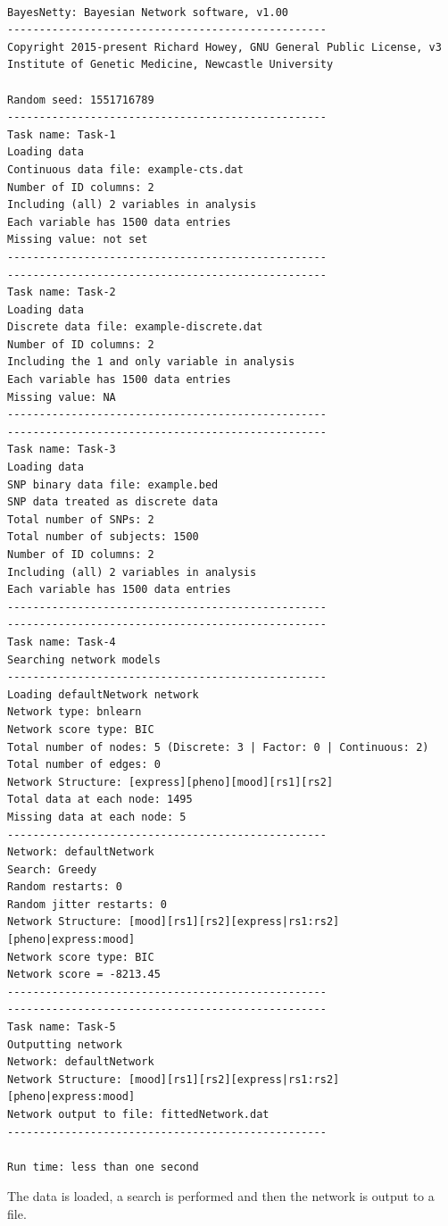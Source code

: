 \documentclass[a4paper,12pt]{article}
\begin{document}
\vspace{0.35cm} \begin{lstlisting}

BayesNetty: Bayesian Network software, v1.00
--------------------------------------------------
Copyright 2015-present Richard Howey, GNU General Public License, v3
Institute of Genetic Medicine, Newcastle University

Random seed: 1551716789
--------------------------------------------------
Task name: Task-1
Loading data
Continuous data file: example-cts.dat
Number of ID columns: 2
Including (all) 2 variables in analysis
Each variable has 1500 data entries
Missing value: not set
--------------------------------------------------
--------------------------------------------------
Task name: Task-2
Loading data
Discrete data file: example-discrete.dat
Number of ID columns: 2
Including the 1 and only variable in analysis
Each variable has 1500 data entries
Missing value: NA
--------------------------------------------------
--------------------------------------------------
Task name: Task-3
Loading data
SNP binary data file: example.bed
SNP data treated as discrete data
Total number of SNPs: 2
Total number of subjects: 1500
Number of ID columns: 2
Including (all) 2 variables in analysis
Each variable has 1500 data entries
--------------------------------------------------
--------------------------------------------------
Task name: Task-4
Searching network models
--------------------------------------------------
Loading defaultNetwork network
Network type: bnlearn
Network score type: BIC
Total number of nodes: 5 (Discrete: 3 | Factor: 0 | Continuous: 2)
Total number of edges: 0
Network Structure: [express][pheno][mood][rs1][rs2]
Total data at each node: 1495
Missing data at each node: 5
--------------------------------------------------
Network: defaultNetwork
Search: Greedy
Random restarts: 0
Random jitter restarts: 0
Network Structure: [mood][rs1][rs2][express|rs1:rs2][pheno|express:mood]
Network score type: BIC
Network score = -8213.45
--------------------------------------------------
--------------------------------------------------
Task name: Task-5
Outputting network
Network: defaultNetwork
Network Structure: [mood][rs1][rs2][express|rs1:rs2][pheno|express:mood]
Network output to file: fittedNetwork.dat
--------------------------------------------------

Run time: less than one second

\end{lstlisting} \vspace{0.35cm}
The data is loaded, a search is performed and then the network is output to a file. 
\end{document}
